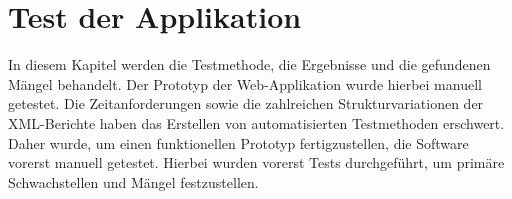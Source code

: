 \newpage
\section{Test der Applikation}
\label{sec:integration-und-test}

In diesem Kapitel werden die Testmethode, die Ergebnisse und die gefundenen Mängel behandelt.
Der Prototyp der Web-Applikation wurde hierbei manuell getestet.
Die Zeitanforderungen sowie die zahlreichen Strukturvariationen der XML-Berichte haben das Erstellen von automatisierten Testmethoden erschwert.
Daher wurde, um einen funktionellen Prototyp fertigzustellen, die Software vorerst manuell getestet.
Hierbei wurden vorerst Tests durchgeführt, um primäre Schwachstellen und Mängel festzustellen.




